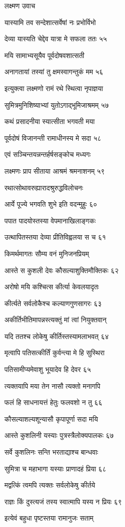 लक्ष्मण उवाच

यास्यामि तव सन्देशात्सर्वेषां नः प्रभोर्विभो

देव्या यास्यति चेद्देव यात्रा मे सफला ततः ५५

मयि सामाभ्यसूयैव पूर्वदोषवशात्सती

अनागतायां तस्यां तु क्षमस्वागन्तुकं मम ५६

इत्युक्त्वा लक्ष्मणो रामं रथे स्थित्वा नृपाज्ञया

सुमित्रमुनिशिष्याभ्यां युतोऽगाद्भूमिजाश्रमम् ५७

कथं प्रसादनीया स्यात्सीता भगवती मया

पूर्वदोषं विजानन्ती रामाधीनस्य मे सदा ५८

एवं सञ्चिन्तयन्नन्तर्हर्षसङ्कोच मध्यगः

लक्ष्मणः प्राप सीताया आश्रमं श्रमनाशनम् ५९

रथात्सोथावरुह्यारादश्रुरुद्धविलोचनः

आर्ये पूज्ये भगवति शुभे इति वदन्मुहुः ६०

पपात पादयोस्तस्या वेपमानाखिलाङ्गकः

उत्थापितस्तया देव्या प्रीतिविह्वलया स च ६१

किमर्थमागतः सौम्य वनं मुनिजनप्रियम्

आस्ते स कुशली देवः कौसल्याशुक्तिमौक्तिकः ६२

अरोषो मयि कश्चित्स कीर्त्या केवलयादृतः

कीर्त्यते सर्वलोकैश्च कल्याणगुणसागरः ६३

अकीर्तिभीतिमापन्नस्त्यक्तुं मां त्वां नियुक्तवान्

यदि ततश्च लोकेषु कीर्तिस्तस्यामलाभवत् ६४

मृत्वापि पतिसत्कीर्तिं कुर्वन्त्या मे हि सुस्थिरा

पतिसामीप्यमेवाशु भूयादेव हि देवर ६५

त्यक्तयापि मया तेन नासौ त्यक्तो मनागपि

फलं हि साधनायत्तं हेतुः फलवशो न तु ६६

कौसल्याशल्यशून्यासौ कृपापूर्णा सदा मयि

आस्ते कुशलिनी यस्याः पुत्रस्त्रैलोक्यपालकः ६७

सर्वे कुशलिनः सन्ति भरताद्याश्च बान्धवाः

सुमित्रा च महाभागा यस्याः प्राणादहं प्रिया ६८

मद्वत्किं त्वमपि त्यक्तः सर्वलोकेषु कीर्तये

राज्ञः किं दुस्त्यजं तस्य स्वात्मापि यस्य न प्रियः ६९

इत्येवं बहुधा पृष्टस्तया रामानुजः सताम्

